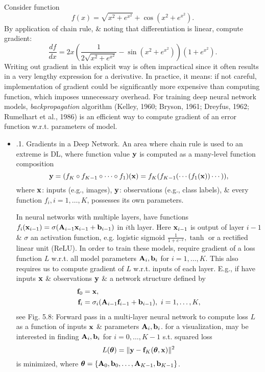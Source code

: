 \documentclass{article}
\begin{document}
\begin{itemize}
\begin{itemize}
		Consider function
		\begin{equation}
			f(x) = \sqrt{x^2 + e^{x^2}} + \cos(x^2 + e^{x^2}).
		\end{equation}
		By application of chain rule, \& noting that differentiation is linear, compute gradient:
		\begin{equation}
			\frac{df}{dx} = 2x\left(\dfrac{1}{2\sqrt{x^2 + e^{x^2}}} - \sin(x^2 + e^{x^2})\right)(1 + e^{x^2}).
		\end{equation}
		Writing out gradient in this explicit way is often impractical since it often results in a very lengthy expression for a derivative. In practice, it means: if not careful, implementation of gradient could be significantly more expensive than computing function, which imposes unnecessary overhead. For training deep neural network models, {\it backpropagation} algorithm (Kelley, 1960; Bryson, 1961; Dreyfus, 1962; Rumelhart et al., 1986) is an efficient way to compute gradient of an error function w.r.t. parameters of model.
		\begin{itemize}
			\item {.1. Gradients in a Deep Network.} An area where chain rule is used to an extreme is DL, where function value ${\bf y}$ is computed as a many-level function composition
			\begin{equation}
				{\bf y} = (f_K\circ f_{K-1}\circ\cdots\circ f_1)({\bf x}) = f_K(f_{K-1}(\cdots(f_1({\bf x}))\cdots)),
			\end{equation}
			where ${\bf x}$: inputs (e.g., images), ${\bf y}$: observations (e.g., class labels), \& every function $f_i,i = 1,\ldots,K$, possesses its own parameters.
			
			In neural networks with multiple layers, have functions $f_i({\bf x}_{i-1}) = \sigma({\bf A}_{i-1}{\bf x}_{i-1} + {\bf b}_{i-1})$ in $i$th layer. Here ${\bf x}_{i-1}$ is output of layer $i - 1$ \& $\sigma$ an activation function, e.g. logistic sigmoid $\frac{1}{1 + e^{-x}},\tanh$ or a rectified linear unit (ReLU). In order to train these models, require gradient of a loss function $L$ w.r.t. all model parameters ${\bf A}_i,{\bf b}_i$ for $i = 1,\ldots,K$. This also requires us to compute gradient of $L$ w.r.t. inputs of each layer. E.g., if have inputs ${\bf x}$ \& observations ${\bf y}$ \& a network structure defined by
			\begin{align}
				{\bf f}_0 &= {\bf x},\\
				{\bf f}_i &= \sigma_i({\bf A}_{i-1}{\bf f}_{i-1} + {\bf b}_{i-1}),\ i = 1,\ldots,K,
			\end{align}
			see {\sf Fig. 5.8: Forward pass in a multi-layer neural network to compute loss $L$ as a function of inputs ${\bf x}$ \& parameters ${\bf A}_i,{\bf b}_i$.} for a visualization, may be interested in finding ${\bf A}_i,{\bf b}_i$ for $i = 0,\ldots,K - 1$ s.t. squared loss
			\begin{equation}
				L(\boldsymbol{\theta}) = \|{\bf y} - {\bf f}_K(\boldsymbol{\theta},{\bf x})\|^2
			\end{equation}
			is minimized, where $\boldsymbol{\theta} = \{{\bf A}_0,{\bf b}_0,\ldots,{\bf A}_{K-1},{\bf b}_{K-1}\}$.
			

\end{itemize}
\end{itemize}
\end{itemize}
\end{document}
